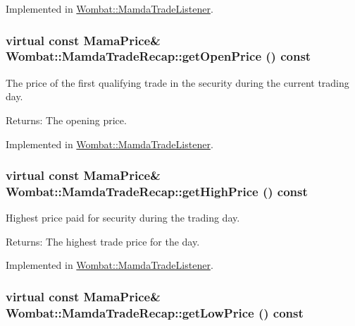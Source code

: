Implemented in \hyperlink{classWombat_1_1MamdaTradeListener_1acaaeffe975eb7f5a9541703ca49f7e}{Wombat::Mamda\-Trade\-Listener}.\hypertarget{classWombat_1_1MamdaTradeRecap_cb3b351b6f32e8e1ec3c7a33864b8726}{
\subsubsection[getOpenPrice]{\setlength{\rightskip}{0pt plus 5cm}virtual const Mama\-Price\& Wombat::Mamda\-Trade\-Recap::get\-Open\-Price () const}}
\label{classWombat_1_1MamdaTradeRecap_cb3b351b6f32e8e1ec3c7a33864b8726}


The price of the first qualifying trade in the security during the current trading day. 

\begin{Desc}
\item[Returns:]The opening price. \end{Desc}


Implemented in \hyperlink{classWombat_1_1MamdaTradeListener_0960023261509bd4192432edb22059c2}{Wombat::Mamda\-Trade\-Listener}.\hypertarget{classWombat_1_1MamdaTradeRecap_2ae346c9697a98d723110ae092742a53}{
\subsubsection[getHighPrice]{\setlength{\rightskip}{0pt plus 5cm}virtual const Mama\-Price\& Wombat::Mamda\-Trade\-Recap::get\-High\-Price () const}}
\label{classWombat_1_1MamdaTradeRecap_2ae346c9697a98d723110ae092742a53}


Highest price paid for security during the trading day. 

\begin{Desc}
\item[Returns:]The highest trade price for the day. \end{Desc}


Implemented in \hyperlink{classWombat_1_1MamdaTradeListener_caff6510c7f5bce0b6d4065c5ae8df53}{Wombat::Mamda\-Trade\-Listener}.\hypertarget{classWombat_1_1MamdaTradeRecap_ecd5be58d9917221102b8d35102f2ff7}{
\subsubsection[getLowPrice]{\setlength{\rightskip}{0pt plus 5cm}virtual const Mama\-Price\& Wombat::Mamda\-Trade\-Recap::get\-Low\-Price () const}}
\label{classWombat_1_1MamdaTradeRecap_ecd5be58d9917221102b8d35102f2ff7}



